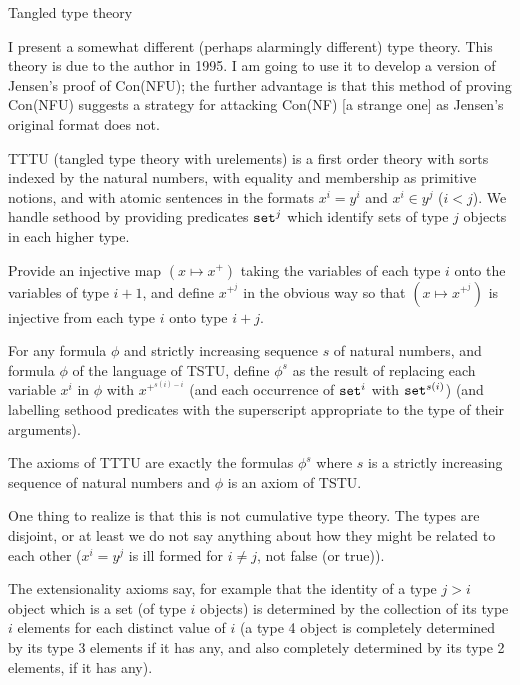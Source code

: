 \documentclass{slides}
\begin{document}
\begin{slide}

{\large Tangled type theory}

I present a somewhat different (perhaps alarmingly different) type theory.  This theory is due to the author in 1995.  I am going to use it to develop a version of Jensen's proof of Con(NFU);  the further advantage is that this method of proving Con(NFU) suggests a strategy for attacking Con(NF) [a strange one] as Jensen's original format does not.

TTTU (tangled type theory with urelements) is a first order theory with sorts indexed by the natural numbers, with equality and membership as primitive notions, and with atomic sentences in the formats $x^i=y^i$ and $x^i \in y^j$ ($i<j$).  We handle sethood by providing predicates ${\tt set}^j$ which identify sets of type $j$ objects in each higher type.

Provide an injective map $(x\mapsto x^+)$ taking the variables of each type $i$ onto the variables of type $i+1$,
and define $x^{+^j}$ in the obvious way so that $(x\mapsto x^{+^j})$ is injective from each type $i$ onto type $i+j$.

For any formula $\phi$ and strictly increasing sequence $s$ of natural numbers, and formula $\phi$ of the language of
TSTU, define $\phi^s$ as the result of replacing each variable $x^i$ in $\phi$ with $x^{+^{s(i)-i}}$ (and each occurrence of
${\tt set}^i$ with ${\tt set}^{s(i)}$) (and labelling sethood predicates with the superscript appropriate to the type of their arguments).

The axioms of TTTU are exactly the formulas $\phi^s$ where $s$ is a strictly increasing sequence of natural numbers and $\phi$ is an axiom of TSTU.

One thing to realize is that this is not cumulative type theory.  The types are disjoint, or at least we do not say anything about how they might be related to each other ($x^i = y^j$ is ill formed for $i \neq j$, not false (or true)).

The extensionality axioms say, for example that the identity of a type $j>i$ object which is a set (of type $i$ objects) is determined by the collection of its type $i$ elements for each distinct value of $i$  (a type 4 object is completely determined by its type 3 elements if it has any, and also completely determined by its type 2 elements, if it has any).

\end{slide}
\end{document}
